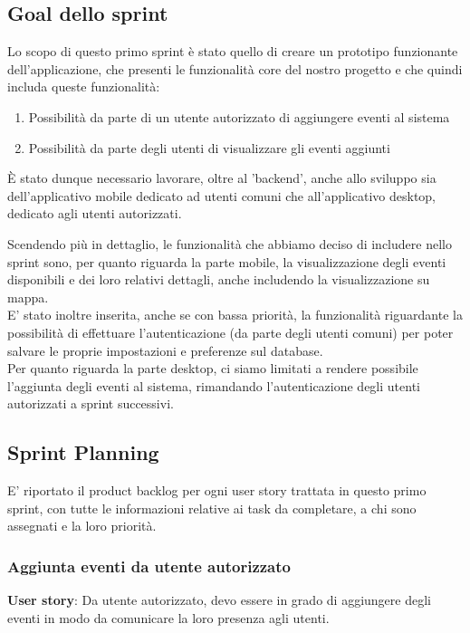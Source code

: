 \documentclass{article}
\begin{document}
\subsection{Goal dello sprint}
Lo scopo di questo primo sprint è stato quello di creare un prototipo funzionante dell'applicazione, che presenti le funzionalità core del nostro progetto e che quindi includa queste funzionalità:
\begin{enumerate}
\item Possibilità da parte di un utente autorizzato di aggiungere eventi al sistema
\item Possibilità da parte degli utenti di visualizzare gli eventi aggiunti
\end{enumerate}
È stato dunque necessario lavorare, oltre al 'backend', anche allo sviluppo sia dell'applicativo mobile dedicato ad utenti comuni che all'applicativo desktop, dedicato agli utenti autorizzati.

Scendendo più in dettaglio, le funzionalità che abbiamo deciso di includere nello sprint sono, per quanto riguarda la parte mobile, la visualizzazione degli eventi disponibili e dei loro relativi dettagli, anche includendo la visualizzazione su mappa.\\
E' stato inoltre inserita, anche se con bassa priorità, la funzionalità riguardante la possibilità di effettuare l'autenticazione (da parte degli utenti comuni) per poter salvare le proprie impostazioni e preferenze sul database.\\
Per quanto riguarda la parte desktop, ci siamo limitati a rendere possibile l'aggiunta degli eventi al sistema, rimandando l'autenticazione degli utenti autorizzati a sprint successivi.

\subsection{Sprint Planning}
E' riportato il product backlog per ogni user story trattata in questo primo sprint, con tutte le informazioni relative ai task da completare, a chi sono assegnati e la loro priorità.\\
\subsubsection{Aggiunta eventi da utente autorizzato}
\textbf{User story}: Da utente autorizzato, devo essere in grado di aggiungere degli eventi in modo da comunicare la loro presenza agli utenti.\\
\end{document}
